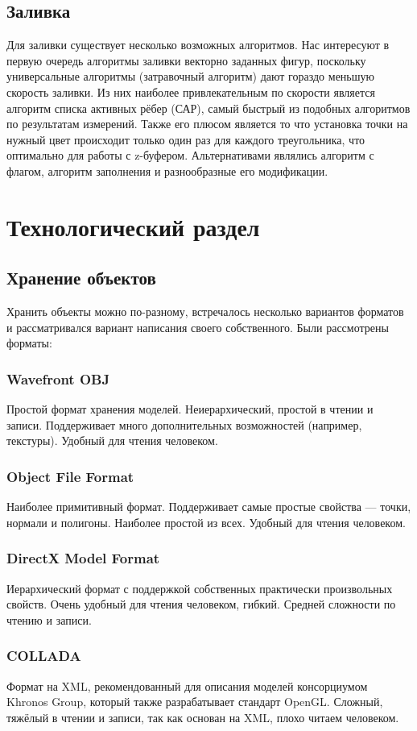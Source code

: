\documentclass[a4paper,12pt]{report}
\begin{document}
\subsection{Заливка}
Для заливки существует несколько возможных алгоритмов. Нас интересуют в первую очередь алгоритмы заливки векторно заданных фигур, поскольку универсальные алгоритмы (затравочный алгоритм) дают гораздо меньшую скорость заливки. Из них наиболее привлекательным по скорости является алгоритм списка активных рёбер (САР), самый быстрый из подобных алгоритмов по результатам измерений. Также его плюсом является то что установка точки на нужный цвет происходит только один раз для каждого треугольника, что оптимально для работы с z-буфером. Альтернативами являлись алгоритм с флагом, алгоритм заполнения и разнообразные его модификации.

\section{Технологический раздел}

\subsection{Хранение объектов}
Хранить объекты можно по-разному, встречалось несколько вариантов форматов и рассматривался вариант написания своего собственного.
Были рассмотрены форматы:
\subsubsection*{Wavefront OBJ}
Простой формат хранения моделей. Неиерархический, простой в чтении и записи. Поддерживает много дополнительных возможностей (например, текстуры). Удобный для чтения человеком.
\subsubsection*{Object File Format}
Наиболее примитивный формат. Поддерживает самые простые свойства --- точки, нормали и полигоны. Наиболее простой из всех. Удобный для чтения человеком.
\subsubsection*{DirectX Model Format}
Иерархический формат с поддержкой собственных практически произвольных свойств. Очень удобный для чтения человеком, гибкий. Средней сложности по чтению и записи.
\subsubsection*{COLLADA}
Формат на XML, рекомендованный для описания моделей консорциумом Khronos Group, который также разрабатывает стандарт OpenGL. Сложный, тяжёлый в чтении и записи, так как основан на XML, плохо читаем человеком.
\end{document}
